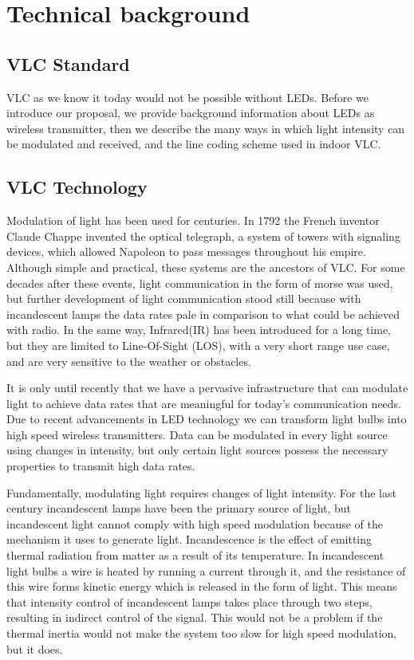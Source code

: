 \chapter{Technical background}
\label{Technical}


\section{VLC Standard}
VLC as we know it today would not be possible without LEDs. Before we introduce
our proposal, we provide background information
about LEDs as wireless transmitter, then we describe the many ways in which
light intensity can be modulated and received, and the line coding scheme used
in indoor VLC.

\section{VLC Technology}

Modulation of light has been used for centuries. In 1792 the French inventor
Claude Chappe invented the optical telegraph, a system of towers with signaling
devices, which allowed Napoleon to pass messages throughout his empire. Although
simple and practical, these systems are the ancestors of VLC. For some decades
after these events, light communication in the form of morse was used, but further
development of light communication stood still because with incandescent lamps
the data rates pale in comparison to what could be achieved with radio. In the same way, 
Infrared(IR) has been introduced for a long time, but they are limited
to Line-Of-Sight (LOS), with a very short range use case, and are very sensitive
to the weather or obstacles.

It is only until recently that we have a pervasive infrastructure that can modulate
light to achieve data rates that are meaningful for today’s communication needs.
Due to recent advancements in LED technology we can transform light bulbs into
high speed wireless transmitters. Data can be modulated in every light source
using changes in intensity, but only certain light sources possess the necessary
properties to transmit high data rates.

Fundamentally, modulating light requires changes of light intensity. For the last
century incandescent lamps have been the primary source of light, but incandescent
light cannot comply with high speed modulation because of the mechanism
it uses to generate light. Incandescence is the effect of emitting thermal radiation
from matter as a result of its temperature. In incandescent light bulbs a wire is
heated by running a current through it, and the resistance of this wire forms kinetic 
energy which is released in the form of light. This means that intensity control
of incandescent lamps takes place through two steps, resulting in indirect control
of the signal. This would not be a problem if the thermal inertia would not make
the system too slow for high speed modulation, but it does.


